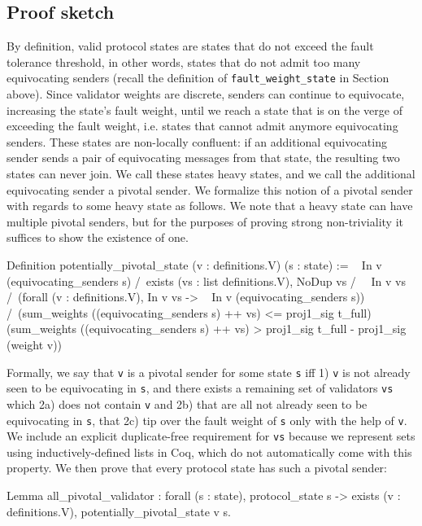\documentclass[runningheads]{llncs}
\begin{document}
\subsection{Proof sketch} 
By definition, valid protocol states are states that do not exceed the fault tolerance threshold, in other words, states that do not admit too many equivocating senders (recall the definition of \verb|fault_weight_state| in Section \label{sec:formalization} above). Since validator weights are discrete, senders can continue to equivocate, increasing the state's fault weight, until we reach a state that is on the verge of exceeding the fault weight, i.e. states that cannot admit anymore equivocating senders. These states are non-locally confluent: if an additional equivocating sender sends a pair of equivocating messages from that state, the resulting two states can never join. We call these states heavy states, and we call the additional equivocating sender a pivotal sender. We formalize this notion of a pivotal sender with regards to some heavy state as follows. We note that a heavy state can have multiple pivotal senders, but for the purposes of proving strong non-triviality it suffices to show the existence of one.
\begin{coq}
Definition potentially_pivotal_state (v : definitions.V) (s : state) :=
	~ In v (equivocating_senders s) /\
	exists (vs : list definitions.V),
	NoDup vs /\
	~ In v vs /\ 
	(forall (v : definitions.V), In v vs -> ~ In v (equivocating_senders s)) /\
	(sum_weights ((equivocating_senders s) ++ vs) <= proj1_sig t_full)%
	(sum_weights ((equivocating_senders s) ++ vs) >
	proj1_sig t_full - proj1_sig (weight v))%
\end{coq}
Formally, we say that \verb|v| is a pivotal sender for some state \verb|s| iff 1) \verb|v| is not already seen to be equivocating in \verb|s|, and there exists a remaining set of validators \verb|vs| which 2a) does not contain \verb|v| and 2b) that are all not already seen to be equivocating in \verb|s|, that 2c) tip over the fault weight of \verb|s| only with the help of \verb|v|. We include an explicit duplicate-free requirement for \verb|vs| because we represent sets using inductively-defined lists in Coq, which do not automatically come with this property. 
We then prove that every protocol state has such a pivotal sender: 
\begin{coq}
Lemma all_pivotal_validator :
	forall (s : state),
	protocol_state s -> 
	exists (v : definitions.V),
	potentially_pivotal_state v s. 
\end{coq}
\end{document}
